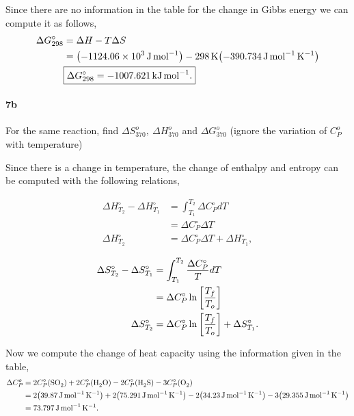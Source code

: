 \documentclass[main.tex]{subfiles}
\begin{document}
Since there are no information in the table for the change in Gibbs energy we can compute it as follows,
\begin{align*}
    \Delta G^\circ_{298} &= \Delta H - T\Delta S \\
    &= \qty(-\SI{1124.06d3}{\joule\per\mole}) - \SI{298}{\kelvin}\qty(-\SI{390.734}{\joule\per\mole\per\kelvin}) \\
    &\boxed{\Delta G^\circ_{298}=-\SI{1007.621}{\kilo\joule\per\mole}.} 
\end{align*}

\paragraph{7b} For the same reaction, find $\Delta S_{370}^o,~\Delta H_{370}^o$ and $\Delta G_{370}^o$ (ignore the variation of $C_P^o$ with temperature)

Since there is a change in temperature, the change of enthalpy and entropy can be computed with the following relations,

\begin{minipage}[c]{0.45\textwidth}
 \begin{align*}
    \Delta H^\circ_{T_2} -\Delta H^\circ_{T_1} &= \int_{T_1}^{T_2}\Delta C_P^\circ dT \\
    &= \Delta C_P^\circ\Delta T \\
    \Delta H^\circ_{T_2}&= \Delta C_P^\circ\Delta T + \Delta H^\circ_{T_1},
\end{align*}   
\end{minipage}
\begin{minipage}[c]{0.45\textwidth}
 \begin{align*}
    \Delta S^\circ_{T_2} -\Delta S^\circ_{T_1} &= \int_{T_1}^{T_2} \frac{\Delta C_P^\circ}{T} dT \\
    &= \Delta C_P^\circ\ln\qty[\frac{T_f}{T_o}] \\
    \Delta S^\circ_{T_2} &= \Delta C_P^\circ\ln\qty[\frac{T_f}{T_o}] + \Delta S^\circ_{T_1}.
\end{align*}   
\end{minipage}

Now we compute the change of heat capacity using the information given in the table,
\begin{align*}
    \Delta C_P^o &= 2C_P^\circ\qty(\ce{SO2}) + 2C_P^\circ\qty(\ce{H2O}) - 2C_P^\circ\qty(\ce{H2S}) - 3C_P^\circ\qty(\ce{O2})\\
    &= 2\qty(\SI{39.87}{\joule\per\mole\per\kelvin}) + 2\qty(\SI{75.291}{\joule\per\mole\per\kelvin}) - 2\qty(\SI{34.23}{\joule\per\mole\per\kelvin}) - 3\qty(\SI{29.355}{\joule\per\mole\per\kelvin})\\
    &= \SI{73.797}{\joule\per\mole\per\kelvin}.
\end{align*}
\end{document}
